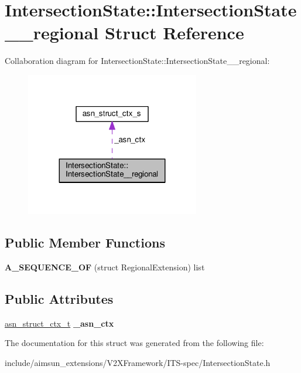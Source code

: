 \hypertarget{structIntersectionState_1_1IntersectionState____regional}{}\section{Intersection\+State\+:\+:Intersection\+State\+\_\+\+\_\+regional Struct Reference}
\label{structIntersectionState_1_1IntersectionState____regional}


Collaboration diagram for Intersection\+State\+:\+:Intersection\+State\+\_\+\+\_\+regional\+:\nopagebreak
\begin{figure}[H]
\begin{center}
\leavevmode
\includegraphics[width=215pt]{structIntersectionState_1_1IntersectionState____regional__coll__graph}
\end{center}
\end{figure}
\subsection*{Public Member Functions}
\begin{DoxyCompactItemize}
\item 
{\bfseries A\+\_\+\+S\+E\+Q\+U\+E\+N\+C\+E\+\_\+\+OF} (struct Regional\+Extension) list\hypertarget{structIntersectionState_1_1IntersectionState____regional_a2e78477b014a64bd39892add765ec009}{}\label{structIntersectionState_1_1IntersectionState____regional_a2e78477b014a64bd39892add765ec009}

\end{DoxyCompactItemize}
\subsection*{Public Attributes}
\begin{DoxyCompactItemize}
\item 
\hyperlink{structasn__struct__ctx__s}{asn\+\_\+struct\+\_\+ctx\+\_\+t} {\bfseries \+\_\+asn\+\_\+ctx}\hypertarget{structIntersectionState_1_1IntersectionState____regional_a8dbb5b35d67902c554f54997f035a46f}{}\label{structIntersectionState_1_1IntersectionState____regional_a8dbb5b35d67902c554f54997f035a46f}

\end{DoxyCompactItemize}


The documentation for this struct was generated from the following file\+:\begin{DoxyCompactItemize}
\item 
include/aimsun\+\_\+extensions/\+V2\+X\+Framework/\+I\+T\+S-\/spec/Intersection\+State.\+h\end{DoxyCompactItemize}
